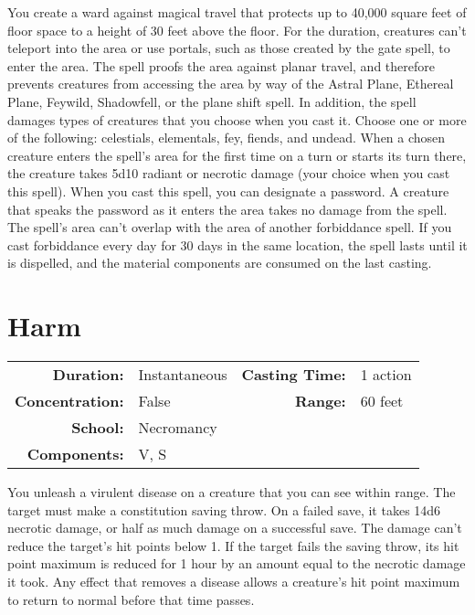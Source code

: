 \documentclass[a5paper, 12pt]{memoir}
\begin{document}
\vspace{1\baselineskip}\noindent You create a ward against magical travel that protects up to 40,000 square feet of floor space to a height of 30 feet above the floor. For the duration, creatures can't teleport into the area or use portals, such as those created by the gate spell, to enter the area. The spell proofs the area against planar travel, and therefore prevents creatures from accessing the area by way of the Astral Plane, Ethereal Plane, Feywild, Shadowfell, or the plane shift spell. In addition, the spell damages types of creatures that you choose when you cast it. Choose one or more of the following: celestials, elementals, fey, fiends, and undead. When a chosen creature enters the spell's area for the first time on a turn or starts its turn there, the creature takes 5d10 radiant or necrotic damage (your choice when you cast this spell). When you cast this spell, you can designate a password. A creature that speaks the password as it enters the area takes no damage from the spell. The spell's area can't overlap with the area of another forbiddance spell. If you cast forbiddance every day for 30 days in the same location, the spell lasts until it is dispelled, and the material components are consumed on the last casting.

\newpage
\section*{Harm}

{
\small\centering\vspace{-6pt}
\begin{tabular}{rlrl}
\toprule

\textbf{Duration:} & Instantaneous &
\textbf{Casting Time:} & 1 action \\
\textbf{Concentration:} & False &
\textbf{Range:} & 60 feet \\
\textbf{School:} & Necromancy \\
\textbf{Components:} & \multicolumn{3}{p{0.7\textwidth}}{V, S}\\

\bottomrule
\end{tabular}
}

\vspace{1\baselineskip}\noindent You unleash a virulent disease on a creature that you can see within range. The target must make a constitution saving throw. On a failed save, it takes 14d6 necrotic damage, or half as much damage on a successful save. The damage can't reduce the target's hit points below 1. If the target fails the saving throw, its hit point maximum is reduced for 1 hour by an amount equal to the necrotic damage it took. Any effect that removes a disease allows a creature's hit point maximum to return to normal before that time passes.
\end{document}
